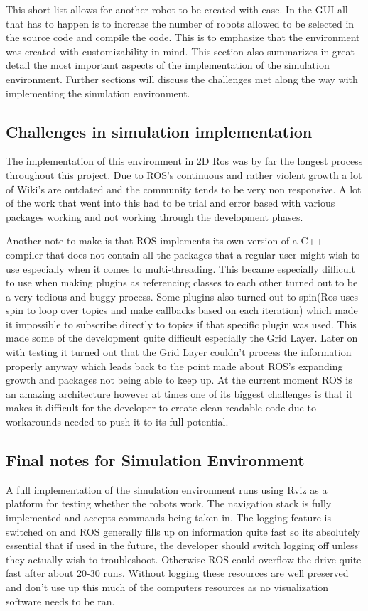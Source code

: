 \documentclass{report}
\begin{document}
        This short list allows for another robot to be created with ease. In the GUI all that has to happen is to increase the number of robots allowed to be selected in the source code and compile the code. This is to emphasize that the environment was created with customizability in mind. This section also summarizes in great detail the most important aspects of the implementation of the simulation environment. Further sections will discuss the challenges met along the way with implementing the simulation environment.

      \subsection{Challenges in simulation implementation}
        The implementation of this environment in 2D Ros was by far the longest process throughout this project. Due to ROS's continuous and rather violent growth a lot of Wiki's are outdated and the community tends to be very non responsive. A lot of the work that went into this had to be trial and error based with various packages working and not working through the development phases.

        Another note to make is that ROS implements its own version of a C++ compiler that does not contain all the packages that a regular user might wish to use especially when it comes to multi-threading. This became especially difficult to use when making plugins as referencing classes to each other turned out to be a very tedious and buggy process. Some plugins also turned out to spin(Ros uses spin to loop over topics and make callbacks based on each iteration) which made it impossible to subscribe directly to topics if that specific plugin was used. This made some of the development quite difficult especially the Grid Layer. Later on with testing it turned out that the Grid Layer couldn't process the information properly anyway which leads back to the point made about ROS's expanding growth and packages not being able to keep up. At the current moment ROS is an amazing architecture however at times one of its biggest challenges is that it makes it difficult for the developer to create clean readable code due to workarounds needed to push it to its full potential.

      \subsection{Final notes for Simulation Environment}
        A full implementation of the simulation environment runs using Rviz as a platform for testing whether the robots work. The navigation stack is fully implemented and accepts commands being taken in. The logging feature is switched on and ROS generally fills up on information quite fast so its absolutely essential that if used in the future, the developer should switch logging off unless they actually wish to troubleshoot. Otherwise ROS could overflow the drive quite fast after about 20-30 runs. Without logging these resources are well preserved and don't use up this much of the computers resources as no visualization software needs to be ran.
\end{document}
